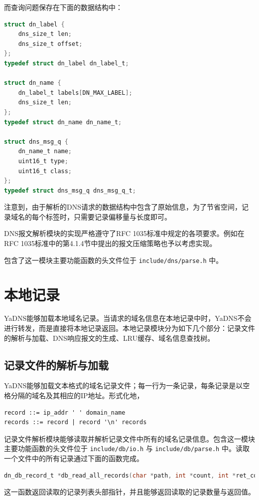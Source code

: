 而查询问题保存在下面的数据结构中：
\begin{lstlisting}[language=C]
struct dn_label {
    dns_size_t len;
    dns_size_t offset;
};
typedef struct dn_label dn_label_t;

struct dn_name {
    dn_label_t labels[DN_MAX_LABEL];
    dns_size_t len;
};
typedef struct dn_name dn_name_t;

struct dns_msg_q {
    dn_name_t name;
    uint16_t type;
    uint16_t class;
};
typedef struct dns_msg_q dns_msg_q_t;
\end{lstlisting}

注意到，由于解析的DNS请求的数据结构中包含了原始信息，为了节省空间，记录域名的每个标签时，只需要记录偏移量与长度即可。

DNS报文解析模块的实现严格遵守了RFC 1035标准中规定的各项要求。例如在RFC 1035标准中的第4.1.4节中提出的报文压缩策略也予以考虑实现。

包含了这一模块主要功能函数的头文件位于 \lstinline{include/dns/parse.h} 中。

\section{本地记录}

YaDNS能够加载本地域名记录。当请求的域名信息在本地记录中时，YaDNS不会进行转发，而是直接将本地记录返回。本地记录模块分为如下几个部分：记录文件的解析与加载、DNS响应报文的生成、LRU缓存、域名信息查找树。

\subsection{记录文件的解析与加载}

YaDNS能够加载文本格式的域名记录文件；每一行为一条记录，每条记录是以空格分隔的域名及其相应的IP地址。形式化地，
\begin{verbatim}
record ::= ip_addr ' ' domain_name
records ::= record | record '\n' records
\end{verbatim}

记录文件解析模块能够读取并解析记录文件中所有的域名记录信息。包含这一模块主要功能函数的头文件位于 \lstinline{include/db/io.h} 与 \lstinline{include/db/parse.h} 中。读取一个文件中的所有记录通过下面的函数完成。

\begin{lstlisting}[language=C]
dn_db_record_t *db_read_all_records(char *path, int *count, int *ret_code);
\end{lstlisting}

这一函数返回读取的记录列表头部指针，并且能够返回读取的记录数量与返回值。

